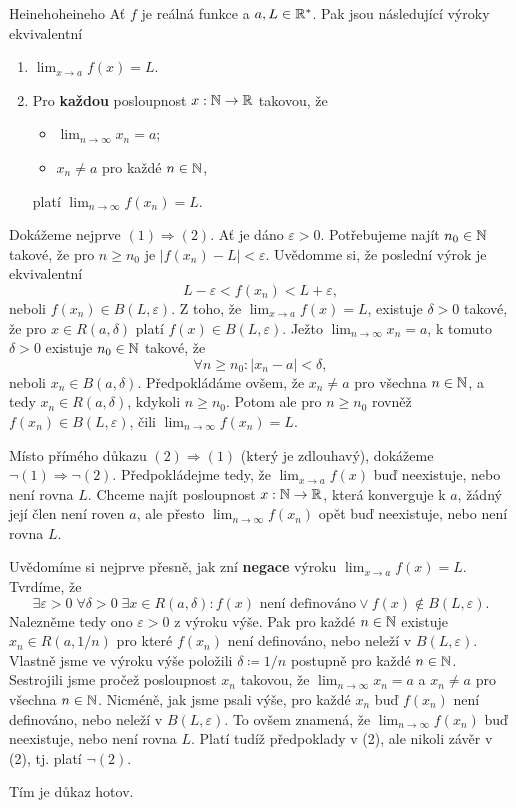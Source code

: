 \begin{theorem}{Heineho}{heineho}
 Ať $f$ je reálná funkce a $a,L \in \mathbb{R}^{*}$. Pak jsou následující výroky
 ekvivalentní
 \begin{enumerate}
  \item $\lim_{x \to a} f(x) = L$.
  \item Pro \textbf{každou} posloupnost $x:\mathbb{N} \to \mathbb{R}$ takovou, že
  \begin{itemize}
   \item $\lim_{n \to \infty} x_n = a$;
   \item $x_n \neq a$ pro každé $n \in \mathbb{N}$,
  \end{itemize}
  platí $\lim_{n \to \infty} f(x_n) = L$.
 \end{enumerate}
\end{theorem}
\begin{thmproof}
 Dokážeme nejprve $(1) \Rightarrow (2)$. Ať je dáno $\varepsilon>0$. Potřebujeme
 najít $n_0 \in \mathbb{N}$ takové, že pro $n \geq n_0$ je $|f(x_n) - L|<\varepsilon$.
 Uvědomme si, že poslední výrok je ekvivalentní
 \[
  L -\varepsilon< f(x_n)<L+\varepsilon,
 \]
 neboli $f(x_n) \in B(L,\varepsilon)$. Z toho, že $\lim_{x \to a} f(x) = L$,
 existuje $\delta>0$ takové, že pro $x \in R(a,\delta)$ platí $f(x) \in
 B(L,\varepsilon)$. Ježto $\lim_{n \to \infty} x_n = a$, k tomuto $\delta>0$
 existuje $n_0 \in \mathbb{N}$ takové, že
 \[
 \forall n \geq n_0: |x_n-a|<\delta,
 \]
 neboli $x_n \in B(a,\delta)$. Předpokládáme ovšem, že $x_n \neq a$ pro všechna
 $n \in \mathbb{N}$, a tedy $x_n \in R(a,\delta)$, kdykoli $n \geq n_0$. Potom ale pro
 $n \geq n_0$ rovněž $f(x_n) \in B(L,\varepsilon)$, čili $\lim_{n \to \infty}
 f(x_n) = L$.

 Místo přímého důkazu $(2) \Rightarrow (1)$ (který je zdlouhavý), dokážeme $\neg
 (1) \Rightarrow \neg (2)$. Předpokládejme tedy, že $\lim_{x \to a} f(x)$ buď
 neexistuje, nebo není rovna $L$. Chceme najít posloupnost $x:\mathbb{N} \to \mathbb{R}$, která
 konverguje k $a$, žádný její člen není roven $a$, ale přesto $\lim_{n \to
 \infty} f(x_n)$ opět buď neexistuje, nebo není rovna $L$.

 Uvědomíme si nejprve přesně, jak zní \textbf{negace} výroku $\lim_{x \to a}
 f(x) = L$. Tvrdíme, že
 \[
 \exists \varepsilon>0 \; \forall \delta>0 \; \exists x \in R(a,\delta): f(x)
 \text{ není definováno} \vee f(x) \notin B(L,\varepsilon).
 \]
 Nalezněme tedy ono $\varepsilon>0$ z výroku výše. Pak pro každé $n \in \mathbb{N}$
 existuje $x_n \in R(a,1 / n)$ pro které $f(x_n)$ není definováno, nebo neleží v
 $B(L,\varepsilon)$. Vlastně jsme ve výroku výše položili $\delta \coloneqq 1 /
 n$ postupně pro každé $n \in \mathbb{N}$. Sestrojili jsme pročež posloupnost $x_n$
 takovou, že $\lim_{n \to \infty} x_n = a$ a $x_n \neq a$ pro všechna $n \in
 \mathbb{N}$. Nicméně, jak jsme psali výše, pro každé $x_n$ buď $f(x_n)$ není
 definováno, nebo neleží v $B(L,\varepsilon)$. To ovšem znamená, že $\lim_{n \to
 \infty} f(x_n)$ buď neexistuje, nebo není rovna $L$. Platí tudíž předpoklady v
 (2), ale nikoli závěr v (2), tj. platí $\neg (2)$.

 Tím je důkaz hotov.
\end{thmproof}

